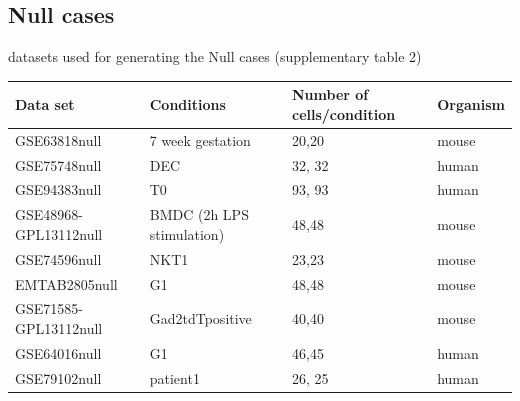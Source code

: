 \documentclass[aoas,preprint]{imsart}
\begin{document}



\subsection{Null cases}

datasets used for generating the Null cases (supplementary table 2)
\begin{table}[h!]
\footnotesize
\centering
\begin{tabular}{ |p{3cm}|p{5cm}|p{3cm}|p{2cm}|}
\hline
 Data set & Conditions & Number of cells/condition & Organism \\
\hline
\hline
GSE63818null & 7 week gestation  & 20,20 &mouse \\
\hline
GSE75748null & DEC & 32, 32 & human\\
\hline
GSE94383null & T0 & 93, 93 & human \\
\hline
GSE48968-GPL13112null & BMDC (2h LPS stimulation) & 48,48 & mouse \\
 \hline
 GSE74596null & NKT1 & 23,23 & mouse\\
 \hline
 EMTAB2805null & G1 & 48,48 & mouse\\
 \hline
GSE71585-GPL13112null &Gad2tdTpositive  & 40,40 & mouse \\
\hline
GSE64016null & G1 & 46,45 & human \\
\hline
GSE79102null & patient1 & 26, 25 & human\\
\hline
\end{tabular}
\end{table}
\end{document}
